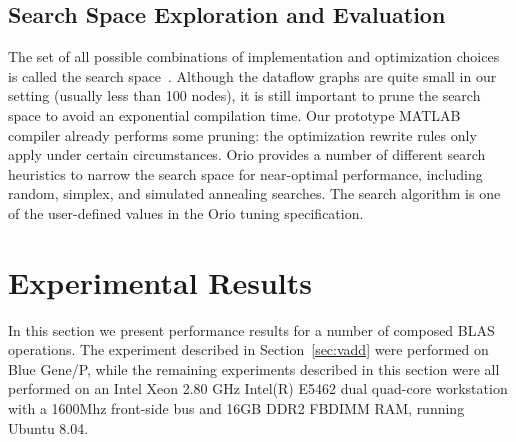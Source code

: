\documentclass[11pt]{article}
\begin{document}
\subsection{Search Space Exploration and Evaluation}
\label{sec:search}

The set of all possible combinations of implementation and optimization choices is called the search space~\cite{Kisuki:2000uq,Triantafyllis:2003uq, Cooper:2005kx}.  Although the dataflow graphs are quite small in our setting (usually less than 100 nodes), it is still important to prune the search space to avoid an exponential compilation time. Our prototype MATLAB compiler already performs some pruning: the optimization rewrite rules only apply under certain circumstances. 
%
%
Orio provides a number of different search heuristics to narrow the search space for near-optimal performance, including random, simplex, and simulated annealing searches. The search algorithm is one of the user-defined values in the Orio tuning specification.

\section{Experimental Results}
\label{sec:experiments}

In this section we present performance results for a number of composed BLAS operations. The experiment described in Section~\ref{sec:vadd} were performed on Blue Gene/P, while the remaining experiments described in this section were all performed on an Intel Xeon 2.80 GHz Intel(R) E5462 dual quad-core workstation with a 1600Mhz front-side bus and 16GB DDR2 FBDIMM RAM, running Ubuntu 8.04.

\end{document}
